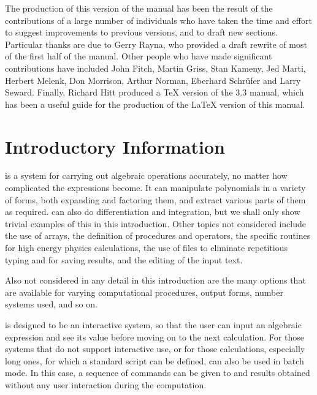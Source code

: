 The production of this version of the manual has been the result of the
contributions of a large number of individuals who have taken the time and
effort to suggest improvements to previous versions, and to draft new
sections.  Particular thanks are due to Gerry Rayna, who provided a draft
rewrite of most of the first half of the manual.  Other people who have
made significant contributions have included John Fitch, Martin Griss,
Stan Kameny, Jed Marti, Herbert Melenk, Don Morrison, Arthur Norman,
Eberhard Schr\"ufer and Larry Seward.  Finally, Richard Hitt produced a {\TeX}
version of the {\REDUCE} 3.3 manual, which has been a useful guide for the
production of the {\LaTeX} version of this manual.

\chapter{Introductory Information}

 is a system for carrying out algebraic
operations accurately, no matter how complicated the expressions become.
It can manipulate polynomials in a variety of forms, both expanding and
factoring them, and extract various parts of them as required.  {\REDUCE} can
also do differentiation and integration, but we shall only show trivial
examples of this in this introduction.  Other topics not
considered include the use of arrays, the definition of procedures and
operators, the specific routines for high energy physics calculations, the
use of files to eliminate repetitious typing and for saving results, and
the editing of the input text.

Also not considered in any detail in this introduction are the many options
that are available for varying computational procedures, output forms,
number systems used, and so on.

{\REDUCE} is designed to be an interactive system, so that the user can input
an algebraic expression and see its value before moving on to the next
calculation.  For those systems that do not support interactive use, or
for those calculations, especially long ones, for which a standard script
can be defined, {\REDUCE} can also be used in batch mode. In this case,
a sequence of commands can be given to {\REDUCE} and results obtained
without any user interaction during the computation.

